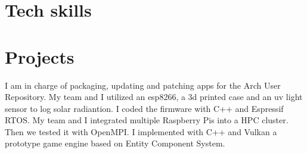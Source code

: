 \documentclass[10pt, a4paper]{moderncv}
\begin{document}
\section{Tech skills}

\section{Projects}
{
	I am in charge of packaging, updating and patching apps for the Arch User Repository.
}
{
	My team and I utilized an esp8266, a 3d printed case and an uv light sensor to log solar radiantion. I coded the firmware with C++ and Espressif RTOS.
}
{
	My team and I integrated multiple Raspberry Pis into a HPC cluster.
	Then we tested it with OpenMPI.
}
{
	I implemented with C++ and Vulkan a prototype game engine based on Entity Component System.
}


\end{document}
